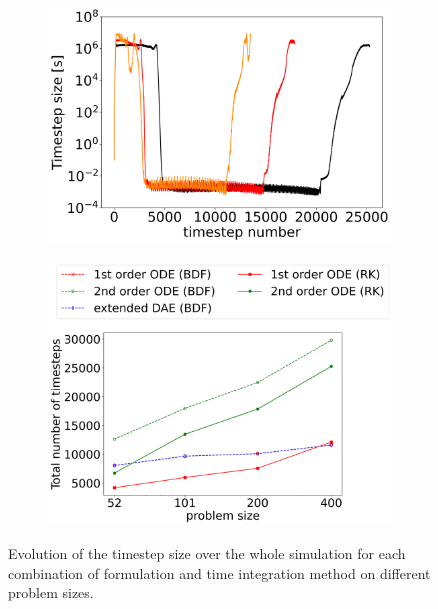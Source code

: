 \begin{figure}[H]
\begin{subfigure}[b]{0.32\textwidth}
		\includegraphics[width=1\textwidth]{images/TANDEM_DT_differentSizes_extendedODE.png}
	\end{subfigure}
	\begin{subfigure}[b]{0.32\textwidth}
		\centering
		\includegraphics[width=1.14\textwidth]{images/TANDEM_NumberTimeSteps_differentSizes.png}
	\end{subfigure}
	\caption{Evolution of the timestep size over the whole simulation for each combination of formulation and time integration method on different problem sizes.}
	\label{fig:scalabilty_timeStepSizes}
\end{figure}
